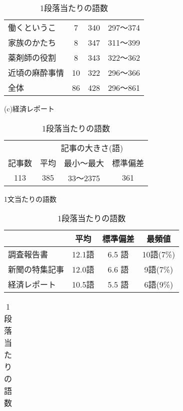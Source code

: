 \begin{table}[htbp]
\begin{minipage}[b]{6.5cm}
\begin{center}
\begin{tabular}{|l|c|c|c|}
      \hline            
      働くというこ  &  7  &  340 &   297〜374 \\%
      家族のかたち  &  8  &  347 &   311〜399 \\%
      \hline            
      薬剤師の役割  &  8  &  343 &   322〜362 \\%
      近頃の麻酔事情& 10  &  322 &   296〜366 \\%
      \hline
      全体          & 86  &  428 &   296〜861 \\%
      \hline
    \end{tabular}
  \end{center}
  \begin{center}
    \leavevmode
    {(c)経済レポート}\par
    \begin{tabular}{|c|c|c|c|}
    \hline
    & \multicolumn{3}{c|}{記事の大きさ(語)} \\
    \cline{2-4}
    記事数 & 平均 & 最小〜最大 & 標準偏差\\
    \hline
       113 &  385 &  33〜2375  & 361 \\
    \hline
    \end{tabular}
  \end{center}
  \end{minipage}
  \begin{minipage}[b]{7.5cm}
  \begin{center}
    \leavevmode
    \caption{1文当たりの語数}
    \label{tab:1文当たりの語数}
    \begin{tabular}{|l|c|c|c|}
      \hline
                       & 平均   & 標準偏差 & 最頻値  \\ 
      \hline
      調査報告書       & 12.1語  & 6.5 語 & 10語(7\%)\\ 
      新聞の特集記事   & 12.0語  & 6.6 語 &  9語(7\%)\\ 
      経済レポート     & 10.5語  & 5.5 語 &  6語(9\%)\\ 
      \hline
    \end{tabular}
  \end{center}
  \begin{center}
    \leavevmode
    \caption{1段落当たりの語数}
    \label{tab:1段落当たりの語数}
    \begin{tabular}{|l|c|c|c|c|}
      \hline

\end{tabular}
\end{center}
\end{minipage}
\end{table}
